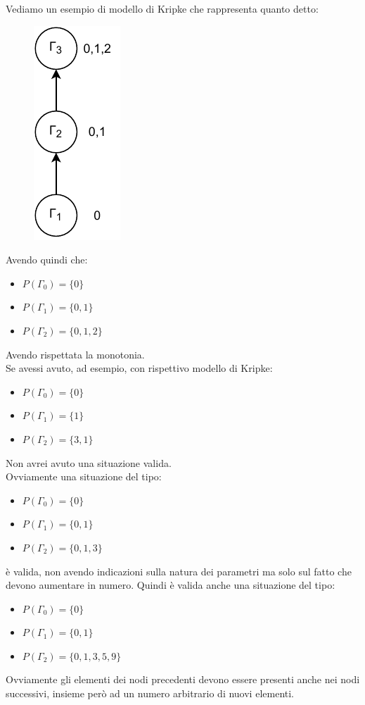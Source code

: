 \documentclass[a4paper,12pt, oneside]{book}
\begin{document}
\begin{esempio}
  Vediamo un esempio di modello di Kripke che rappresenta quanto detto:
  \begin{figure}[H]
    \centering
    \includegraphics[scale = 1.1]{img/k4.pdf}
  \end{figure}
  Avendo quindi che:
  \begin{itemize}
    \item $P(\Gamma_0)=\{0\}$
    \item $P(\Gamma_1)=\{0,1\}$
    \item $P(\Gamma_2)=\{0,1,2\}$
  \end{itemize}
  Avendo rispettata la monotonia.\\
  Se avessi avuto, ad esempio, con rispettivo modello di Kripke:
  \begin{itemize}
    \item $P(\Gamma_0)=\{0\}$
    \item $P(\Gamma_1)=\{1\}$
    \item $P(\Gamma_2)=\{3,1\}$
  \end{itemize}
  Non avrei avuto una situazione valida.\\
  Ovviamente una situazione del tipo:
  \begin{itemize}
    \item $P(\Gamma_0)=\{0\}$
    \item $P(\Gamma_1)=\{0,1\}$
    \item $P(\Gamma_2)=\{0,1,3\}$
  \end{itemize}
  è valida, non avendo indicazioni sulla natura dei parametri ma solo sul fatto
  che devono aumentare in numero. Quindi è valida anche una situazione del tipo:
  \begin{itemize}
    \item $P(\Gamma_0)=\{0\}$
    \item $P(\Gamma_1)=\{0,1\}$
    \item $P(\Gamma_2)=\{0,1,3,5,9\}$
  \end{itemize}
  Ovviamente gli elementi dei nodi precedenti devono essere presenti anche nei
  nodi successivi, insieme però ad un numero arbitrario di nuovi elementi.
\end{esempio}
\end{document}
